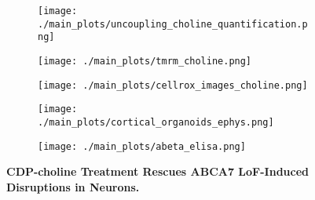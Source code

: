 \begin{figure}[H]
    \hspace{.4cm}
    \begin{subfigure}[t]{.17\textwidth}
        \caption{}
        \vspace{.4cm}
        \texttt{[image: ./main\_plots/uncoupling\_choline\_quantification.png]}        
    \end{subfigure}  
    \hspace{.4cm}  
    \begin{subfigure}[t]{.35\textwidth}
        \caption{}
        \vspace{-0.15cm}
        \texttt{[image: ./main\_plots/tmrm\_choline.png]}        
    \end{subfigure} 
   
    \begin{subfigure}[t]{.35\textwidth}
        \caption{}
        \texttt{[image: ./main\_plots/cellrox\_images\_choline.png]}        
    \end{subfigure}
    \hspace{.4cm}
    \begin{subfigure}[t]{.2\textwidth}
        \caption{}
        \texttt{[image: ./main\_plots/cortical\_organoids\_ephys.png]}        
    \end{subfigure} 
    \hspace{.4cm}
    \begin{subfigure}[t]{.4\textwidth}
        \caption{}
        \texttt{[image: ./main\_plots/abeta\_elisa.png]}        
    \end{subfigure}  
    \caption{
        \textbf{CDP-choline Treatment Rescues ABCA7 LoF-Induced Disruptions in Neurons.}\\
    }
    \label{fig:main_choline}
\end{figure}
